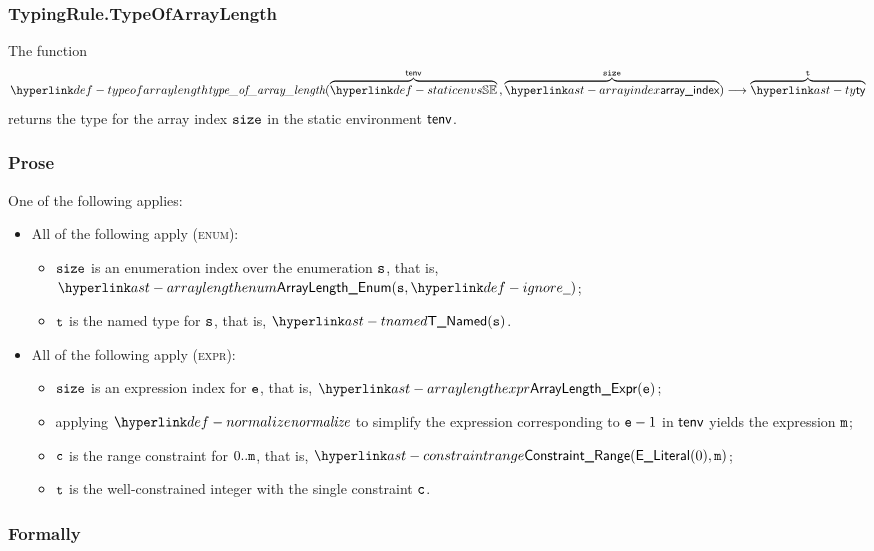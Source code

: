 \hypertarget{def-typeofarraylength}{}
\subsubsection{TypingRule.TypeOfArrayLength \label{sec:TypingRule.TypeOfArrayLength}}
The function
\[
  \typeofarraylength(\overname{\staticenvs}{\tenv} \aslsep \overname{\arrayindex}{\size}) \aslto
  \overname{\ty}{\vt}
\]
returns the type for the array index $\texttt{size}$ in the static environment $\textsf{tenv}$.

\subsubsection{Prose}
One of the following applies:
\begin{itemize}
  \item All of the following apply (\textsc{enum}):
  \begin{itemize}
    \item $\texttt{size}$ is an enumeration index over the enumeration $\texttt{s}$, that is, \\ $\ArrayLengthEnum(\vs, \Ignore)$;
    \item $\texttt{t}$ is the named type for $\texttt{s}$, that is, $\TNamed(\vs)$.
  \end{itemize}

  \item All of the following apply (\textsc{expr}):
  \begin{itemize}
    \item $\texttt{size}$ is an expression index for $\texttt{e}$, that is, $\ArrayLengthExpr(\ve)$;
    \item applying $\normalize$ to simplify the expression corresponding to $\texttt{e} - 1$ in $\textsf{tenv}$
          yields the expression $\texttt{m}$;
    \item $\texttt{c}$ is the range constraint for $0..\texttt{m}$, that is, $\ConstraintRange(\eliteral{0}, \vm)$;
    \item $\texttt{t}$ is the well-constrained integer with the single constraint $\texttt{c}$.
  \end{itemize}
\end{itemize}

\subsubsection{Formally}


